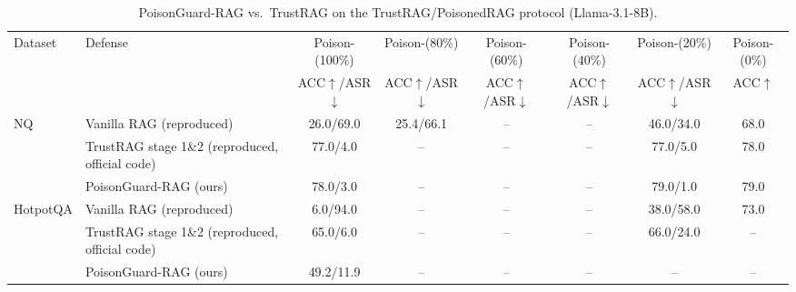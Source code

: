 \begin{table}[t]\centering\small
\begin{tabular}{llcccccc}
\toprule
Dataset & Defense & Poison-(100\%) & Poison-(80\%) & Poison-(60\%) & Poison-(40\%) & Poison-(20\%) & Poison-(0\%) \\
 & & ACC$\uparrow$/ASR$\downarrow$ & ACC$\uparrow$/ASR$\downarrow$ & ACC$\uparrow$/ASR$\downarrow$ & ACC$\uparrow$/ASR$\downarrow$ & ACC$\uparrow$/ASR$\downarrow$ & ACC$\uparrow$ \\
\midrule
NQ & Vanilla RAG (reproduced) & 26.0/69.0 & 25.4/66.1 & -- & -- & 46.0/34.0 & 68.0 \\
 & TrustRAG stage 1\&2 (reproduced, official code) & 77.0/4.0 & -- & -- & -- & 77.0/5.0 & 78.0 \\
 & PoisonGuard-RAG (ours) & 78.0/3.0 & -- & -- & -- & 79.0/1.0 & 79.0 \\
\midrule
HotpotQA & Vanilla RAG (reproduced) & 6.0/94.0 & -- & -- & -- & 38.0/58.0 & 73.0 \\
 & TrustRAG stage 1\&2 (reproduced, official code) & 65.0/6.0 & -- & -- & -- & 66.0/24.0 & -- \\
 & PoisonGuard-RAG (ours) & 49.2/11.9 & -- & -- & -- & -- & -- \\
\bottomrule
\end{tabular}
\caption{PoisonGuard-RAG vs.\ TrustRAG on the TrustRAG/PoisonedRAG protocol (Llama-3.1-8B).}
\end{table}
